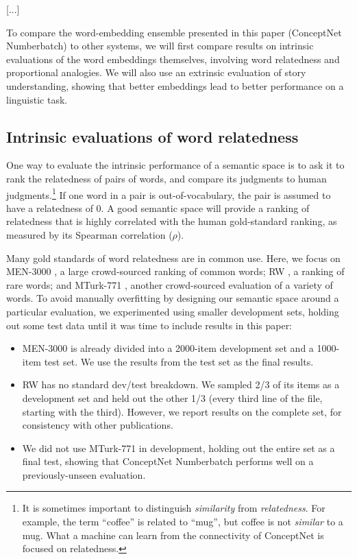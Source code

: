 \documentclass[letterpaper]{article}
\begin{document}
[...]

To compare the word-embedding ensemble presented in this paper (ConceptNet
Numberbatch) to other systems, we will first compare results on intrinsic
evaluations of the word embeddings themselves, involving word relatedness and
proportional analogies. We will also use an extrinsic evaluation of story
understanding, showing that better embeddings lead to better performance on a
linguistic task.

\subsection{Intrinsic evaluations of word relatedness}
\label{intrinsic-evaluations}

One way to evaluate the intrinsic performance of a semantic space is to ask it
to rank the relatedness of pairs of words, and compare its judgments to human
judgments.\footnote{It is sometimes important to distinguish \emph{similarity}
from \emph{relatedness}. For example, the term ``coffee'' is related to
``mug'', but coffee is not \emph{similar} to a mug. What a machine can learn
from the connectivity of ConceptNet is focused on relatedness.} If one word in
a pair is out-of-vocabulary, the pair is assumed to have a relatedness of 0. A
good semantic space will provide a ranking of relatedness that is highly
correlated with the human gold-standard ranking, as measured by its Spearman
correlation ($\rho$).

Many gold standards of word relatedness are in common use. Here, we focus on
MEN-3000 \cite{bruni2014men}, a large crowd-sourced ranking of common words; RW
\cite{luong2013rw}, a ranking of rare words; and MTurk-771
\cite{halawi2012mturk}, another crowd-sourced evaluation of a variety of words.
To avoid manually overfitting by designing our semantic space around a
particular evaluation, we experimented using smaller development sets, holding
out some test data until it was time to include results in this paper:

\begin{itemize}
\item
    MEN-3000 is already divided into a 2000-item development set and a
    1000-item test set. We use the results from the test set as the final results.
\item
    RW has no standard dev/test breakdown. We sampled 2/3 of its items as
    a development set and held out the other 1/3 (every third line of the file,
    starting with the third). However, we report results on the complete set,
    for consistency with other publications.
\item
    We did not use MTurk-771 in development, holding out the entire set
    as a final test, showing that ConceptNet Numberbatch performs well on a
    previously-unseen evaluation.
\end{itemize}
\end{document}
